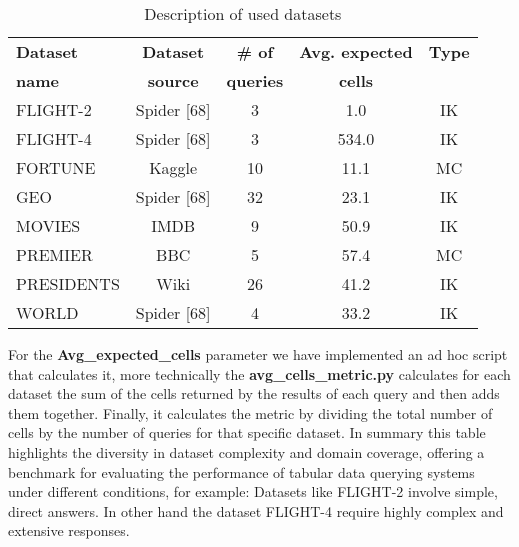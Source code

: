 \documentclass[12pt,a4paper]{article}
\begin{document}
\begin{table}[h]
\centering
\begin{tabular}{lcccc}
\toprule
\textbf{Dataset} & \textbf{Dataset} & \textbf{\# of} & \textbf{Avg. expected} & \textbf{Type} \\
\textbf{name} & \textbf{source} & \textbf{queries} & \textbf{cells} & \\
\midrule
FLIGHT-2 & Spider [68] & 3 & 1.0 & IK \\
FLIGHT-4 & Spider [68] & 3 & 534.0 & IK \\
FORTUNE & Kaggle & 10 & 11.1 & MC \\
GEO & Spider [68] & 32 & 23.1 & IK \\
MOVIES & IMDB & 9 & 50.9 & IK \\
PREMIER & BBC & 5 & 57.4 & MC \\
PRESIDENTS & Wiki & 26 & 41.2 & IK \\
WORLD & Spider [68] & 4 & 33.2 & IK \\


\bottomrule
\end{tabular}
\caption{Description of used datasets}
\label{tab:datasets}
\end{table}


For the \textbf{Avg\_expected\_cells} parameter we have implemented an ad hoc script that calculates it, more technically the \textbf{avg\_cells\_metric.py} calculates for each dataset the sum of the cells returned by the results of each query and then adds them together.
Finally, it calculates the metric by dividing the total number of cells by the number of queries for that specific dataset.
In summary this table  highlights the diversity in dataset complexity and domain coverage, offering a benchmark for evaluating the performance of tabular data querying systems under different conditions, for example: Datasets like FLIGHT-2 involve simple, direct answers.
In other hand the dataset FLIGHT-4  require highly complex and extensive responses.
\end{document}
